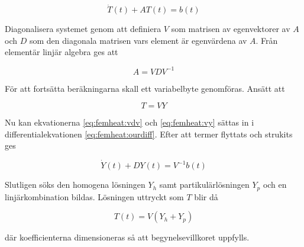\begin{equation}
\label{eq:femheat:ourdiff}
\dot{T}(t) + AT(t) = b(t)
\end{equation}

Diagonalisera systemet genom att definiera $V$ som matrisen av egenvektorer av $A$ och $D$ som den
diagonala matrisen vars element är egenvärdena av $A$. Från elementär linjär algebra\cite{lay06} ges att

\begin{equation}
\label{eq:femheat:vdv}
A = VDV^{-1}
\end{equation}

För att fortsätta beräkningarna skall ett variabelbyte genomföras. Ansätt att

\begin{equation}
\label{eq:femheat:vy}
T = VY
\end{equation}

Nu kan ekvationerna \eqref{eq:femheat:vdv} och \eqref{eq:femheat:vy} sättas in i differentialekvationen
\eqref{eq:femheat:ourdiff}. Efter att termer flyttats och strukits ges

\begin{equation}
\dot{Y}(t) + DY(t) = V^{-1}b(t)
\end{equation}

Slutligen söks den homogena lösningen $Y_h$ samt partikulärlösningen $Y_p$ och en linjärkombination bildas.
Lösningen uttryckt som $T$ blir då

\begin{equation}
\label{eq:femheat:solution}
T(t) = V(Y_h+Y_p)
\end{equation}

där koefficienterna dimensioneras så att begynelsevillkoret uppfylls.
